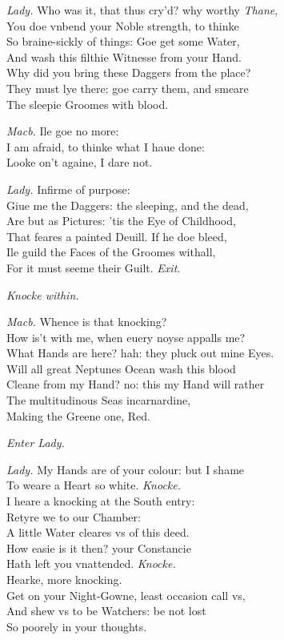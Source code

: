 \documentclass[12pt]{sides}
\newcommand{\clStageDir}[1]{\hspace*{\fill}\textit{#1}\hspace*{\fill}}
\newcommand{\elStageDir}[1]{\hfill\textit{#1}}
\newcommand{\dia}[1]{\hskip 15pt\textit{#1}\hskip 6pt}
\begin{document}
\begin{multicols}{2}
            \dia{Lady.} Who was it, that thus cry'd? why worthy \textit{Thane}, \\ You doe vnbend your Noble strength, to thinke \\ So braine-sickly of things: Goe get some Water, \\ And wash this filthie Witnesse from your Hand. \\ Why did you bring these Daggers from the place? \\ They must lye there: goe carry them, and smeare \\ The sleepie Groomes with blood.

            \dia{Macb.} Ile goe no more: \\ I am afraid, to thinke what I haue done: \\ Looke on't againe, I dare not.

            \dia{Lady.} Infirme of purpose: \\ Giue me the Daggers: the sleeping, and the dead, \\ Are but as Pictures: 'tis the Eye of Childhood, \\ That feares a painted Deuill. If he doe bleed, \\ Ile guild the Faces of the Groomes withall, \\ For it must seeme their Guilt. \clStageDir{Exit.}
            
            \elStageDir{Knocke within.} \hspace{32pt}

            \dia{Macb.} Whence is that knocking? \\ How is't with me, when euery noyse appalls me? \\ What Hands are here? hah: they pluck out mine Eyes. \\ Will all great Neptunes Ocean wash this blood \\ Cleane from my Hand? no: this my Hand will rather \\ The multitudinous Seas incarnardine, \\ Making the Greene one, Red.

            \clStageDir{Enter Lady.}
            
            \dia{Lady.} My Hands are of your colour: but I shame \\ To weare a Heart so white. \clStageDir{Knocke.} \hspace{1pt} \\ I heare a knocking at the South entry: \\ Retyre we to our Chamber: \\ A little Water cleares vs of this deed. \\ How easie is it then? your Constancie \\ Hath left you vnattended. \clStageDir{Knocke.} \\ Hearke, more knocking. \\ Get on your Night-Gowne, least occasion call vs, \\ And shew vs to be Watchers: be not lost \\ So poorely in your thoughts.


\end{multicols}
\end{document}
